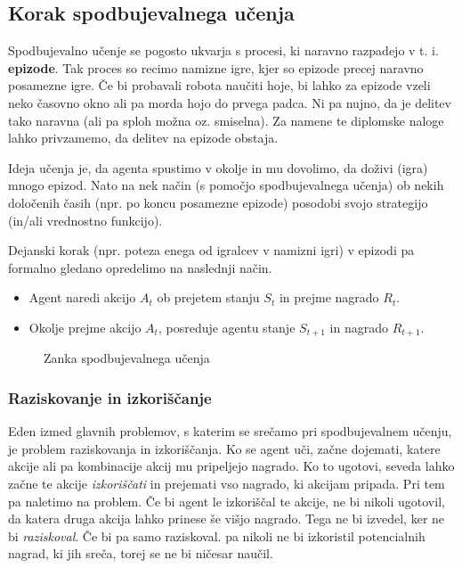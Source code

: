 \documentclass[12pt,a4paper]{amsart}
\theoremstyle{definition} %
\theoremstyle{plain} %
\begin{document}
\subsection{Korak spodbujevalnega učenja}
Spodbujevalno učenje se pogosto ukvarja s procesi, ki naravno razpadejo v t. i. \textbf{epizode}. 
Tak proces so recimo namizne igre, kjer so epizode precej naravno posamezne igre. Če bi probavali 
robota naučiti hoje, bi lahko za epizode vzeli neko časovno okno ali pa morda hojo do prvega padca.
Ni pa nujno, da je delitev tako naravna (ali pa sploh možna oz. smiselna). Za namene te diplomske 
naloge lahko privzamemo, da delitev na epizode obstaja.

Ideja učenja je, da agenta spustimo v okolje in mu dovolimo, da doživi (igra) mnogo epizod. Nato 
na nek način (s pomočjo spodbujevalnega učenja) ob nekih določenih časih (npr. po koncu posamezne 
epizode) posodobi svojo strategijo (in/ali vrednostno funkcijo). 

Dejanski korak (npr. poteza enega od igralcev v namizni igri) v epizodi pa formalno gledano opredelimo
 na naslednji način.
\begin{itemize}
    \item Agent naredi akcijo $A_t$ ob prejetem stanju $S_t$ in prejme nagrado $R_t$.
    \item Okolje prejme akcijo $A_t$, posreduje agentu stanje $S_{t+1}$ in nagrado $R_{t+1}$.
\end{itemize}
\begin{center}
    \begin{figure}[h]
    \caption{Zanka spodbujevalnega učenja}
    \end{figure}
\end{center}
\subsubsection{Raziskovanje in izkoriščanje}
Eden izmed glavnih problemov, s katerim se srečamo pri spodbujevalnem učenju, je problem 
raziskovanja in izkoriščanja. Ko se agent uči, začne dojemati, katere akcije ali pa kombinacije 
akcij mu pripeljejo nagrado. Ko to ugotovi, seveda lahko začne te akcije \textit{izkoriščati} in 
prejemati vso nagrado, ki akcijam pripada. Pri tem pa naletimo na problem. Če bi agent le izkoriščal 
te akcije, ne bi nikoli ugotovil, da katera druga akcija lahko prinese še višjo nagrado. Tega ne bi 
izvedel, ker ne bi \textit{raziskoval}. Če bi pa samo raziskoval. pa nikoli ne bi izkoristil potencialnih
 nagrad, ki jih sreča, torej se ne bi ničesar naučil.
\end{document}
